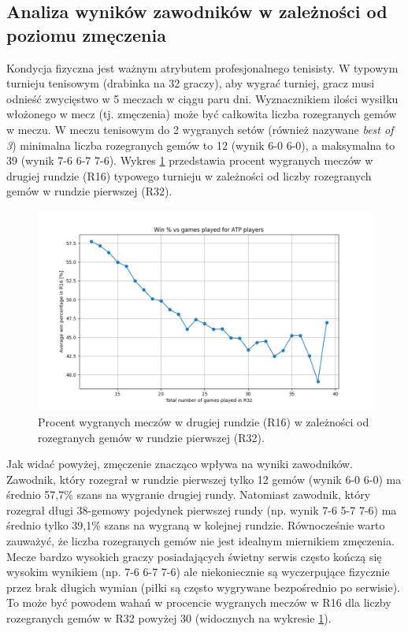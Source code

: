 \documentclass[12pt, a4paper]{article}
\begin{document}
\subsection{Analiza wyników zawodników w zależności od poziomu zmęczenia}
Kondycja fizyczna jest ważnym atrybutem profesjonalnego tenisisty. W typowym turnieju tenisowym (drabinka na 32 graczy), aby wygrać turniej, gracz musi odnieść zwycięstwo w 5 meczach w ciągu paru dni. Wyznacznikiem ilości wysiłku włożonego w mecz (tj. zmęczenia) może być całkowita liczba rozegranych gemów w meczu. W meczu tenisowym do 2 wygranych setów (również nazywane \textit{best of 3}) minimalna liczba rozegranych gemów to 12 (wynik 6-0 6-0), a maksymalna to 39 (wynik 7-6 6-7 7-6). Wykres \ref{fig:win_games_played} przedstawia procent wygranych meczów w drugiej rundzie (R16) typowego turnieju w zależności od liczby rozegranych gemów w rundzie pierwszej (R32).
\begin{figure}[h]
    \includegraphics[width=\textwidth]{figures/win_games_played.png}
    \caption{Procent wygranych meczów w drugiej rundzie (R16) w zależności od rozegranych gemów w rundzie pierwszej (R32).}
    \label{fig:win_games_played}
\end{figure}

Jak widać powyżej, zmęczenie znacząco wpływa na wyniki zawodników. Zawodnik, który rozegrał w rundzie pierwszej tylko 12 gemów (wynik 6-0 6-0) ma średnio 57,7\% szans na wygranie drugiej rundy. Natomiast zawodnik, który rozegrał długi 38-gemowy pojedynek pierwszej rundy (np. wynik 7-6 5-7 7-6) ma średnio tylko 39,1\% szans na wygraną w kolejnej rundzie. Równocześnie warto zauważyć, że liczba rozegranych gemów nie jest idealnym miernikiem zmęczenia. Mecze bardzo wysokich graczy posiadających świetny serwis często kończą się wysokim wynikiem (np. 7-6 6-7 7-6) ale niekoniecznie są wyczerpujące fizycznie przez brak długich wymian (piłki są często wygrywane bezpośrednio po serwisie). To może być powodem wahań w procencie wygranych meczów w R16 dla liczby rozegranych gemów w R32 powyżej 30 (widocznych na wykresie \ref{fig:win_games_played}).
\end{document}

